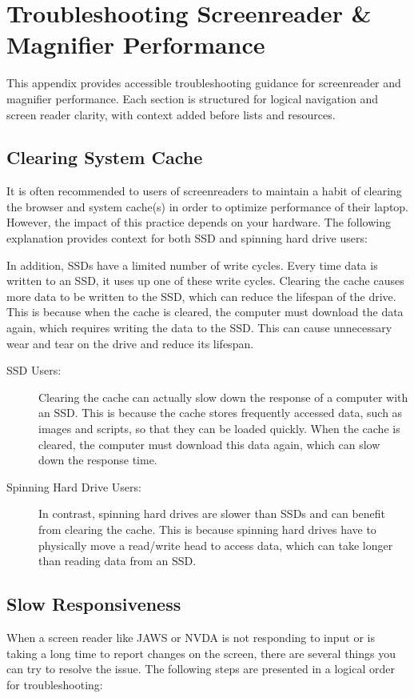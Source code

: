 \chapter{Troubleshooting Screenreader \& Magnifier Performance}
\label{troubleshooting}

\begin{raggedright}
This appendix provides accessible troubleshooting guidance for screenreader and magnifier performance. Each section is structured for logical navigation and screen reader clarity, with context added before lists and resources.
\end{raggedright}

\section{Clearing System Cache}
\label{cache}
It is often recommended to users of screenreaders to maintain a habit of clearing the browser and system cache(s) in order to optimize performance of their laptop. However, the impact of this practice depends on your hardware. The following explanation provides context for both SSD and spinning hard drive users:

In addition, SSDs have a limited number of write cycles. Every time data is written to an SSD, it uses up one of these write cycles. Clearing the cache causes more data to be written to the SSD, which can reduce the lifespan of the drive. This is because when the cache is cleared, the computer must download the data again, which requires writing the data to the SSD. This can cause unnecessary wear and tear on the drive and reduce its lifespan.

\begin{description}
    \item[SSD Users:] Clearing the cache can actually slow down the response of a computer with an SSD. This is because the cache stores frequently accessed data, such as images and scripts, so that they can be loaded quickly. When the cache is cleared, the computer must download this data again, which can slow down the response time.
    \item[Spinning Hard Drive Users:] In contrast, spinning hard drives are slower than SSDs and can benefit from clearing the cache. This is because spinning hard drives have to physically move a read/write head to access data, which can take longer than reading data from an SSD.
\end{description}

\section{Slow Responsiveness}
\label{response}
When a screen reader like JAWS or NVDA is not responding to input or is taking a long time to report changes on the screen, there are several things you can try to resolve the issue. The following steps are presented in a logical order for troubleshooting:

